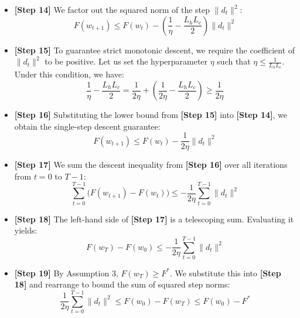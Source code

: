 \documentclass[11pt]{article}
\begin{document}
\begin{itemize}
    \item \textbf{[Step 14]} We factor out the squared norm of the step $\|d_t\|^2$:
    \begin{equation}
        F(w_{t+1}) \leq F(w_t) - \left( \frac{1}{\eta} - \frac{L_h L_c}{2} \right) \|d_t\|^2
    \end{equation}
    
    \item \textbf{[Step 15]} To guarantee strict monotonic descent, we require the coefficient of $\|d_t\|^2$ to be positive. Let us set the hyperparameter $\eta$ such that $\eta \leq \frac{1}{L_h L_c}$. Under this condition, we have:
    \begin{equation}
        \frac{1}{\eta} - \frac{L_h L_c}{2} = \frac{1}{2\eta} + \left( \frac{1}{2\eta} - \frac{L_h L_c}{2} \right) \geq \frac{1}{2\eta}
    \end{equation}
    
    \item \textbf{[Step 16]} Substituting the lower bound from \textbf{[Step 15]} into \textbf{[Step 14]}, we obtain the single-step descent guarantee:
    \begin{equation}
        F(w_{t+1}) \leq F(w_t) - \frac{1}{2\eta} \|d_t\|^2
    \end{equation}
    
    \item \textbf{[Step 17]} We sum the descent inequality from \textbf{[Step 16]} over all iterations from $t=0$ to $T-1$:
    \begin{equation}
        \sum_{t=0}^{T-1} \big( F(w_{t+1}) - F(w_t) \big) \leq -\frac{1}{2\eta} \sum_{t=0}^{T-1} \|d_t\|^2
    \end{equation}
    
    \item \textbf{[Step 18]} The left-hand side of \textbf{[Step 17]} is a telescoping sum. Evaluating it yields:
    \begin{equation}
        F(w_T) - F(w_0) \leq -\frac{1}{2\eta} \sum_{t=0}^{T-1} \|d_t\|^2
    \end{equation}
    
    \item \textbf{[Step 19]} By Assumption 3, $F(w_T) \geq F^*$. We substitute this into \textbf{[Step 18]} and rearrange to bound the sum of squared step norms:
    \begin{equation}
        \frac{1}{2\eta} \sum_{t=0}^{T-1} \|d_t\|^2 \leq F(w_0) - F(w_T) \leq F(w_0) - F^*
    \end{equation}
    

\end{itemize}
\end{document}
